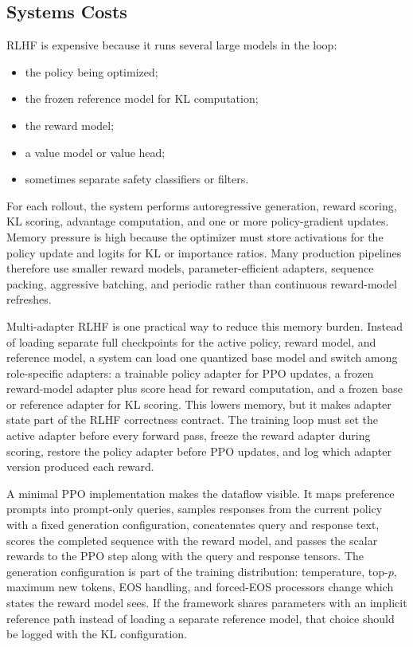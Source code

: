 \subsection{Systems Costs}
RLHF is expensive because it runs several large models in the loop:
\begin{itemize}
    \item the policy being optimized;
    \item the frozen reference model for KL computation;
    \item the reward model;
    \item a value model or value head;
    \item sometimes separate safety classifiers or filters.
\end{itemize}
For each rollout, the system performs autoregressive generation, reward scoring, KL scoring, advantage computation, and one or more policy-gradient updates. Memory pressure is high because the optimizer must store activations for the policy update and logits for KL or importance ratios. Many production pipelines therefore use smaller reward models, parameter-efficient adapters, sequence packing, aggressive batching, and periodic rather than continuous reward-model refreshes.

Multi-adapter RLHF is one practical way to reduce this memory burden. Instead of loading separate full checkpoints for the active policy, reward model, and reference model, a system can load one quantized base model and switch among role-specific adapters: a trainable policy adapter for PPO updates, a frozen reward-model adapter plus score head for reward computation, and a frozen base or reference adapter for KL scoring. This lowers memory, but it makes adapter state part of the RLHF correctness contract. The training loop must set the active adapter before every forward pass, freeze the reward adapter during scoring, restore the policy adapter before PPO updates, and log which adapter version produced each reward.

A minimal PPO implementation makes the dataflow visible. It maps preference prompts into prompt-only queries, samples responses from the current policy with a fixed generation configuration, concatenates query and response text, scores the completed sequence with the reward model, and passes the scalar rewards to the PPO step along with the query and response tensors. The generation configuration is part of the training distribution: temperature, top-$p$, maximum new tokens, EOS handling, and forced-EOS processors change which states the reward model sees. If the framework shares parameters with an implicit reference path instead of loading a separate reference model, that choice should be logged with the KL configuration.

